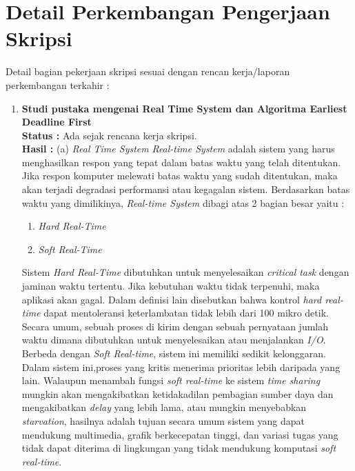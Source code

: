 \documentclass[a4paper,twoside]{article}
\begin{document}
\section{Detail Perkembangan Pengerjaan Skripsi}
Detail bagian pekerjaan skripsi sesuai dengan rencan kerja/laporan perkembangan terkahir :
	\begin{enumerate}
		\item \textbf{Studi pustaka mengenai Real Time System dan Algoritma Earliest Deadline First}\\
		{\bf Status :} Ada sejak rencana kerja skripsi.\\
		{\bf Hasil : \newline } 
		(a) {\it Real Time System}\newline
        {\it Real-time System} adalah sistem yang harus menghasilkan respon yang tepat dalam batas waktu yang telah ditentukan. Jika respon komputer melewati batas waktu yang sudah ditentukan, maka akan terjadi degradasi performansi atau kegagalan sistem. Berdasarkan batas waktu yang dimilikinya, {\it Real-time System} dibagi atas 2 bagian besar yaitu :
		    \begin{enumerate}
		        \item {\it Hard Real-Time}
		        \item {\it Soft Real-Time}
		    \end{enumerate}
		Sistem {\it Hard Real-Time} dibutuhkan untuk menyelesaikan {\it critical task} dengan jaminan waktu tertentu. Jika kebutuhan waktu tidak terpenuhi, maka aplikasi akan gagal. Dalam definisi lain disebutkan bahwa kontrol {\it hard real-time} dapat mentoleransi keterlambatan tidak lebih dari 100 mikro detik. Secara umum, sebuah proses di kirim dengan sebuah pernyataan jumlah waktu dimana dibutuhkan untuk menyelesaikan atau menjalankan {\it I/O}.\newline \newline
		Berbeda dengan {\it Soft Real-time}, sistem ini memiliki sedikit kelonggaran. Dalam sistem ini,proses yang kritis menerima prioritas lebih daripada yang lain. Walaupun menambah fungsi {\it soft real-time} ke sistem {\it time sharing} mungkin akan mengakibatkan ketidakadilan pembagian sumber daya dan mengakibatkan {\it delay} yang lebih lama, atau mungkin menyebabkan {\it starvation}, hasilnya adalah tujuan secara umum sistem yang dapat mendukung multimedia, grafik berkecepatan tinggi, dan variasi tugas yang tidak dapat diterima di lingkungan yang tidak mendukung komputasi {\it soft real-time}.
		\newline \newline \newpage
		

\end{enumerate}
\end{document}
